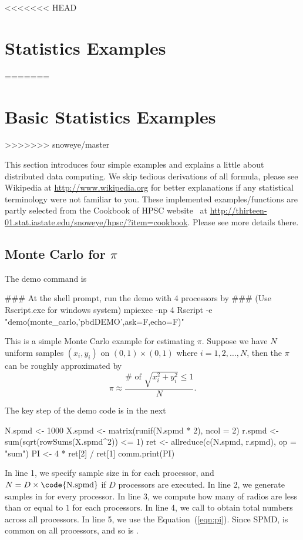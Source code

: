 <<<<<<< HEAD
\section[Statistics Examples]{Statistics Examples}
=======

\section[Basic Statistics Examples]{Basic Statistics Examples}
>>>>>>> snoweye/master
\label{sec:statistics_examples}

This section introduces four simple examples and explains a little about
distributed data computing. We skip tedious derivations of all formula,
please see Wikipedia at \url{http://www.wikipedia.org} for better
explanations if any statistical terminology were not familiar to you.
These implemented examples/functions are partly
selected from the Cookbook of HPSC website~\citep{hpsc2011} at
\url{http://thirteen-01.stat.iastate.edu/snoweye/hpsc/?item=cookbook}.
Please see more details there.




\subsection[Monte Carlo for $\pi$]{Monte Carlo for $\pi$}
\label{sec:monte_carlo}

The demo command is
\begin{Command}
### At the shell prompt, run the demo with 4 processors by
### (Use Rscript.exe for windows system)
mpiexec -np 4 Rscript -e "demo(monte_carlo,'pbdDEMO',ask=F,echo=F)"
\end{Command}

This is a simple Monte Carlo example for estimating $\pi$.
Suppose we have $N$ uniform samples $(x_i, y_i)$ on $(0, 1)\times (0,1)$
where $i = 1, 2, \ldots, N$, then
the $\pi$ can be roughly approximated by
\begin{equation}
\pi \approx \frac{\# \mbox{ of } \sqrt{x_i^2+y_i^2} \leq 1}{N}.
\label{eqn:pi}
\end{equation}

The key step of the demo code is in the next
\begin{Code}[title=R Code,numbers=left]
N.spmd <- 1000
X.spmd <- matrix(runif(N.spmd * 2), ncol = 2)
r.spmd <- sum(sqrt(rowSums(X.spmd^2)) <= 1)
ret <- allreduce(c(N.spmd, r.spmd), op = "sum")
PI <- 4 * ret[2] / ret[1]
comm.print(PI)
\end{Code}
In line 1, we specify sample size in  for each processor,
and $N=D\times\mbox{\code{N.spmd}}$ if $D$ processors are executed.
In line 2, we generate samples in  for every processor.
In line 3, we compute how many of radios are less than or equal to $1$
for each processors.
In line 4, we call  to obtain total numbers across all
processors.
In line 5, we use the Equation~(\ref{eqn:pi}).
Since SPMD,  is common on all processors, and so is .




